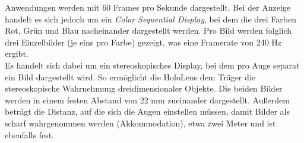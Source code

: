Anwendungen werden mit 60 Frames pro Sekunde dargestellt. Bei der Anzeige handelt es sich jedoch um ein \textit{Color Sequential Display}, bei dem die drei Farben Rot, Grün und Blau nacheinander dargestellt werden. Pro Bild werden folglich drei Einzelbilder (je eins pro Farbe) gezeigt, was eine Framerate von 240 Hz ergibt.\\

Es handelt sich dabei um ein stereoskopisches Display, bei dem pro Auge separat ein Bild dargestellt wird. So ermöglicht die HoloLens dem Träger die stereoskopische Wahrnehmung dreidimensionaler Objekte. Die beiden Bilder werden in einem festen Abstand von 22 mm zueinander dargestellt. Außerdem beträgt die Distanz, auf die sich die Augen einstellen müssen, damit Bilder als scharf wahrgenommen werden (Akkommodation), etwa zwei Meter und ist ebenfalls fest.\\


